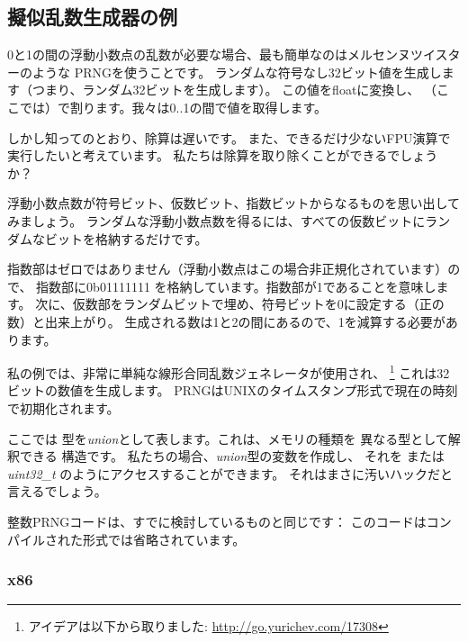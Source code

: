 \subsection{擬似乱数生成器の例}
\label{FPU_PRNG}

0と1の間の浮動小数点の乱数が必要な場合、最も簡単なのはメルセンヌツイスターのような
\ac{PRNG}を使うことです。
ランダムな符号なし32ビット値を生成します（つまり、ランダム32ビットを生成します）。
この値をfloatに変換し、
（ここでは）で割ります。我々は0..1の間で値を取得します。

しかし知ってのとおり、除算は遅いです。
また、できるだけ少ないFPU演算で実行したいと考えています。
私たちは除算を取り除くことができるでしょうか？


浮動小数点数が符号ビット、仮数ビット、指数ビットからなるものを思い出してみましょう。
ランダムな浮動小数点数を得るには、すべての仮数ビットにランダムなビットを格納するだけです。

指数部はゼロではありません（浮動小数点はこの場合非正規化されています）ので、
指数部に0b01111111
を格納しています。指数部が1であることを意味します。
次に、仮数部をランダムビットで埋め、符号ビットを0に設定する（正の数）と出来上がり。
生成される数は1と2の間にあるので、1を減算する必要があります。

\newcommand{\URLXOR}{\url{http://go.yurichev.com/17308}}

私の例では、非常に単純な線形合同乱数ジェネレータが使用され、
\footnote{アイデアは以下から取りました: \URLXOR} これは32ビットの数値を生成します。 
\ac{PRNG}はUNIXのタイムスタンプ形式で現在の時刻で初期化されます。

ここでは \Tfloat 型を\emph{union}として表します。これは、メモリの種類を
異なる型として解釈できる \CCpp 構造です。
私たちの場合、\emph{union}型の変数を作成し、
それを \Tfloat  または \emph{uint32\_t} のようにアクセスすることができます。
それはまさに汚いハックだと言えるでしょう。


整数\ac{PRNG}コードは、すでに検討しているものと同じです：
このコードはコンパイルされた形式では省略されています。



\subsubsection{x86}

